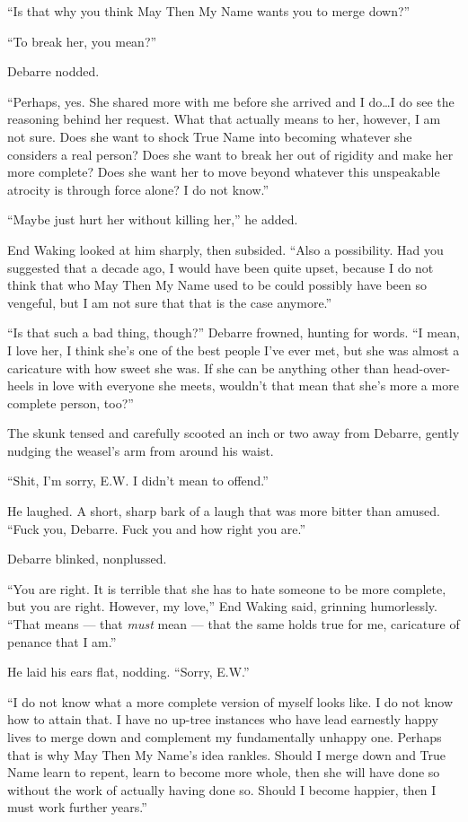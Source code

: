 ``Is that why you think May Then My Name wants you to merge down?''

``To break her, you mean?''

Debarre nodded.

``Perhaps, yes. She shared more with me before she arrived and I do\ldots I do see the reasoning behind her request. What that actually means to her, however, I am not sure. Does she want to shock True Name into becoming whatever she considers a real person? Does she want to break her out of rigidity and make her more complete? Does she want her to move beyond whatever this unspeakable atrocity is through force alone? I do not know.''

``Maybe just hurt her without killing her,'' he added.

End Waking looked at him sharply, then subsided. ``Also a possibility. Had you suggested that a decade ago, I would have been quite upset, because I do not think that who May Then My Name used to be could possibly have been so vengeful, but I am not sure that that is the case anymore.''

``Is that such a bad thing, though?'' Debarre frowned, hunting for words. ``I mean, I love her, I think she's one of the best people I've ever met, but she was almost a caricature with how sweet she was. If she can be anything other than head-over-heels in love with everyone she meets, wouldn't that mean that she's more a more complete person, too?''

The skunk tensed and carefully scooted an inch or two away from Debarre, gently nudging the weasel's arm from around his waist.

``Shit, I'm sorry, E.W. I didn't mean to offend.''

He laughed. A short, sharp bark of a laugh that was more bitter than amused. ``Fuck you, Debarre. Fuck you and how right you are.''

Debarre blinked, nonplussed.

``You are right. It is terrible that she has to hate someone to be more complete, but you are right. However, my love,'' End Waking said, grinning humorlessly. ``That means — that \emph{must} mean — that the same holds true for me, caricature of penance that I am.''

He laid his ears flat, nodding. ``Sorry, E.W.''

``I do not know what a more complete version of myself looks like. I do not know how to attain that. I have no up-tree instances who have lead earnestly happy lives to merge down and complement my fundamentally unhappy one. Perhaps that is why May Then My Name's idea rankles. Should I merge down and True Name learn to repent, learn to become more whole, then she will have done so without the work of actually having done so. Should I become happier, then I must work further years.''

